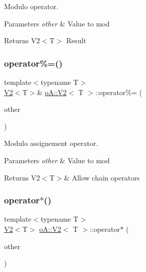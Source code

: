 Modulo operator. 


\begin{DoxyParams}{Parameters}
{\em other} & Value to mod \\
\hline
\end{DoxyParams}
\begin{DoxyReturn}{Returns}
V2$<$\+T$>$ Result 
\end{DoxyReturn}
\mbox{\label{structo_a_1_1_v2_acd10d3ff2a5744713a159eebd0d89a4e}} 
\subsubsection{\texorpdfstring{operator\%=()}{operator\%=()}}
{\footnotesize\ttfamily template$<$typename T$>$ \\
\mbox{\hyperlink{structo_a_1_1_v2}{V2}}$<$T$>$\& \mbox{\hyperlink{structo_a_1_1_v2}{o\+A\+::\+V2}}$<$ T $>$\+::operator\%= (\begin{DoxyParamCaption}\item[{const \mbox{\hyperlink{structo_a_1_1_v2}{o\+A\+::\+V2}}$<$ T $>$ \&}]{other }\end{DoxyParamCaption})\hspace{0.3cm}{\ttfamily [inline]}}



Modulo assignement operator. 


\begin{DoxyParams}{Parameters}
{\em other} & Value to mod \\
\hline
\end{DoxyParams}
\begin{DoxyReturn}{Returns}
V2$<$\+T$>$\& Allow chain operators 
\end{DoxyReturn}
\mbox{\label{structo_a_1_1_v2_a9e3ca71d8d85ad4bbcb418080acafceb}} 
\subsubsection{\texorpdfstring{operator$\ast$()}{operator*()}}
{\footnotesize\ttfamily template$<$typename T$>$ \\
\mbox{\hyperlink{structo_a_1_1_v2}{V2}}$<$T$>$ \mbox{\hyperlink{structo_a_1_1_v2}{o\+A\+::\+V2}}$<$ T $>$\+::operator$\ast$ (\begin{DoxyParamCaption}\item[{const \mbox{\hyperlink{structo_a_1_1_v2}{o\+A\+::\+V2}}$<$ T $>$ \&}]{other }\end{DoxyParamCaption})\hspace{0.3cm}{\ttfamily [inline]}}




